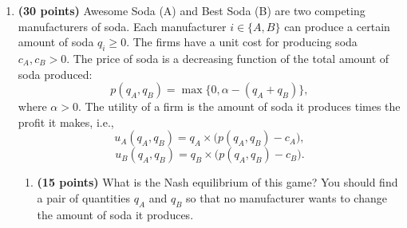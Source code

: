 \documentclass[11pt]{article}
\begin{document}
\begin{enumerate}[label=\textbf{\arabic*.}, leftmargin=*]
\begin{enumerate}[label=(\alph*)]
    \item \textbf{(5 points)} What will player C say? Present your answer using information sets and player beliefs.

    \item \textbf{(5 points)} Is it true that for any assignment of hats to the players some player will know the color of their hat? Explain your answer using information sets and player beliefs.
\end{enumerate}

\textbf{Solution:}

\textbf{a)}

C says: "Yes, my hat is red"\\

Information Set: 

A says no, which eliminates
\[
RBB
\]
B says no, which eliminates
\[
RRB, \ BRB
\]
Therefore, the remaining possible worlds are
\[
\{RRR, RBR, BRR, BBR\}
\]
\[
C = R
\]

\textbf{b)}

Yes\\

If \(A\) sees two blue hats, then the actual world is \(RBB\), so \(A\) knows that his hat is red.

If \(A\) says no, then \(RBB\) is eliminated. Now if \(C\) is wearing a blue hat, then \(B\) knows that his own hat cannot be blue; otherwise \(A\) would have seen two blue hats and would not have said no. Hence \(B\) knows that his hat is red.

If \(B\) also says no, then \(C\) cannot be wearing a blue hat. Therefore, \(C\) is wearing a red hat

\newpage

\item \textbf{(30 points)} Awesome Soda (A) and Best Soda (B) are two competing manufacturers of soda. Each manufacturer $i \in \{A, B\}$ can produce a certain amount of soda $q_i \ge 0$. The firms have a unit cost for producing soda $c_A, c_B > 0$. The price of soda is a decreasing function of the total amount of soda produced:
\[
    p(q_A, q_B) = \max\{0, \alpha - (q_A + q_B)\},
\]
where $\alpha > 0$. The utility of a firm is the amount of soda it produces times the profit it makes, i.e.,
\[
    u_A(q_A, q_B) = q_A \times \bigl(p(q_A, q_B) - c_A\bigr),
\]
\[
    u_B(q_A, q_B) = q_B \times \bigl(p(q_A, q_B) - c_B\bigr).
\]

\begin{enumerate}[label=(\alph*)]
    \item \textbf{(15 points)} What is the Nash equilibrium of this game? You should find a pair of quantities $q_A$ and $q_B$ so that no manufacturer wants to change the amount of soda it produces.


\end{enumerate}
\end{enumerate}
\end{document}
